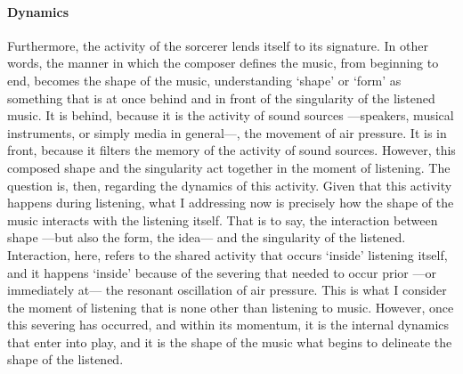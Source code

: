 \paragraph{Dynamics}
Furthermore, the activity of the sorcerer lends itself to its signature. In other words, the manner in which the composer defines the music, from beginning to end, becomes the shape of the music, understanding `shape' or `form' as something that is at once behind and in front of the singularity of the listened music. It is behind, because it is the activity of sound sources ---speakers, musical instruments, or simply media in general---, the movement of air pressure. It is in front, because it filters the memory of the activity of sound sources. However, this composed shape and the singularity act together in the moment of listening. The question is, then, regarding the dynamics of this activity. Given that this activity happens during listening, what I addressing now is precisely how the shape of the music interacts with the listening itself. That is to say, the interaction between shape ---but also the form, the idea--- and the singularity of the listened. Interaction, here, refers to the shared activity that occurs `inside' listening itself, and it happens `inside' because of the severing that needed to occur prior ---or immediately at--- the resonant oscillation of air pressure. This is what I consider the moment of listening that is none other than listening to music. However, once this severing has occurred, and within its momentum, it is the internal dynamics that enter into play, and it is the shape of the music what begins to delineate the shape of the listened.


